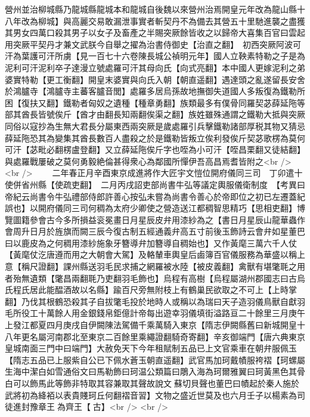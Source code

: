 營州並治柳城縣乃龍城縣龍城本和龍城自後魏以來營州治焉開皇元年改為龍山縣十八年改為柳城】與高麗交易敢漏泄事實者斬契丹不為備去其營五十里馳進襲之盡獲其男女四萬口殺其男子以女子及畜產之半賜突厥餘皆收之以歸帝大喜集百官曰雲起用突厥平契丹才兼文武朕今自舉之擢為治書侍御史【治直之翻】　初西突厥阿波可汗為葉護可汗所虜【見一百七十六卷陳長城公禎明元年】國人立鞅素特勒之子是為泥利可汗泥利卒子達漫立號處羅可汗其母向氏【向式亮翻】本中國人更嫁泥利之弟婆實特勒【更工衡翻】開皇末婆實與向氏入朝【朝直遥翻】遇達頭之亂遂留長安舍於鴻臚寺【鴻臚寺主蕃客臚音閭】處羅多居烏孫故地撫御失道國人多叛復為鐵勒所困【復扶又翻】鐵勒者匈奴之遺種【種章勇翻】族類最多有僕骨同羅契苾薛延陁等部其酋長皆號俟斤【酋才由翻長知兩翻俟渠之翻】族姓雖殊通謂之鐵勒大抵與突厥同俗以寇抄為生無大君長分屬東西兩突厥是歲處羅引兵擊鐵勒諸部厚税其物又猜忌薛延陁恐其為變集其酋長數百人盡殺之於是鐵勒皆叛立俟利發俟斤契苾歌楞為莫何可汗【苾毗必翻楞盧登翻】又立薛延陁俟斤字也咥為小可汗【咥昌栗翻又徒結翻】與處羅戰屢破之莫何勇毅絶倫甚得衆心為鄰國所憚伊吾高昌焉耆皆附之<br />
<br />
　　二年春正月辛酉東京成進將作大匠宇文愷位開府儀同三司　丁卯遣十使併省州縣【使疏吏翻】　二月丙戌詔吏部尚書牛弘等議定輿服儀衛制度　【考異曰帝紀云尚書令牛弘禮部侍郎許善心按弘未嘗為尚書令善心於帝即位之初已左遷蓋紀誤也】以開府儀同三司何稠為太府少卿使之營造送江都稠智思精巧【思相吏翻】博覽圖籍參會古今多所損益衮冕畫日月星辰皮弁用漆紗為之【書日月星辰山龍華蟲作會周升日月於旌旗而闕三辰今復古制五經通義弁高五寸前後玉飾詩云會弁如星董巴曰以鹿皮為之何稠用漆紗施象牙簪導弁加簪導自稠始也】又作黃麾三萬六千人仗【黃麾仗汔唐遵而用之大朝會大駕】及輅輦車輿皇后鹵簿百官儀服務為華盛以稱上意【稱尺證翻】課州縣送羽毛民求捕之網羅被水陸【被皮義翻】禽獸有堪氅毦之用者殆無遺類【氅昌兩翻毦乃吏翻羽毛飾也】烏程有高樹【烏程屬湖州郡國志曰古烏氏程氏居此能醖酒故以名縣】踰百尺旁無附枝上有鶴巢民欲取之不可上【上時掌翻】乃伐其根鶴恐殺其子自拔氅毛投於地時人或稱以為瑞曰天子造羽儀鳥獸自獻羽毛所役工十萬餘人用金銀錢帛鉅億計帝每出遊幸羽儀填街溢路亘二十餘里三月庚午上發江都夏四月庚戌自伊闕陳法駕備千乘萬騎入東京【隋志伊闕縣舊曰新城開皇十八年更名屬河南郡北至東京二百餘里乘繩證翻騎奇寄翻】辛亥御端門【唐六典東京皇城南面三門中曰端門】大赦免天下今年租賦制五品已上文官乘車在朝弁服佩玉【隋志五品已上服紫自公已下佩水蒼玉朝直遥翻】武官馬加珂戴幘服袴褶【珂螺屬生海中潔白如雪通俗文曰馬勒飾曰珂温公類篇曰鵰入海為珂爾雅翼曰珂黃黑色其骨白可以飾馬此等飾非特取其容兼取其聲故說文蘇切貝聲也董巴曰幘起於秦人施於武將初為絳袹以表貴賤珂丘何翻褶音習】文物之盛近世莫及也六月壬子以楊素為司徒進封豫章王為齊王【古】<br />
<br />
